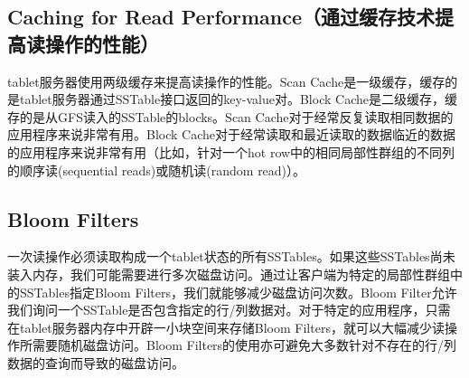 \documentclass{article}
\begin{document}
\subsection{Caching for Read Performance（通过缓存技术提高读操作的性能）}
tablet服务器使用两级缓存来提高读操作的性能。Scan Cache是一级缓存，缓存的是tablet服务器通过SSTable接口返回的key-value对。Block Cache是二级缓存，缓存的是从GFS读入的SSTable的blocks。Scan Cache对于经常反复读取相同数据的应用程序来说非常有用。Block Cache对于经常读取和最近读取的数据临近的数据的应用程序来说非常有用（比如，针对一个hot row中的相同局部性群组的不同列的顺序读(sequential reads)或随机读(random read)）。

\subsection{Bloom Filters}
一次读操作必须读取构成一个tablet状态的所有SSTables。如果这些SSTables尚未装入内存，我们可能需要进行多次磁盘访问。通过让客户端为特定的局部性群组中的SSTables指定Bloom Filters，我们就能够减少磁盘访问次数。Bloom Filter允许我们询问一个SSTable是否包含指定的行/列数据对。对于特定的应用程序，只需在tablet服务器内存中开辟一小块空间来存储Bloom Filters，就可以大幅减少读操作所需要随机磁盘访问。Bloom Filters的使用亦可避免大多数针对不存在的行/列数据的查询而导致的磁盘访问。
\end{document}
